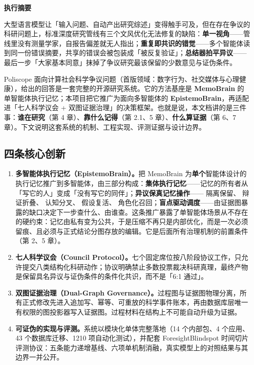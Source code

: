 \thispagestyle{fancy}
{\sffamily\bfseries\fontsize{20}{24}\selectfont\color{ink} 执行摘要\par}
\vspace{0.5em}
\noindent{\color{linegray}\rule{\linewidth}{1pt}}
\vspace{1em}

大型语言模型让「输入问题、自动产出研究综述」变得触手可及，但在存在争议的科研问题上，标准深度研究管线有三个文风优化无法修复的缺陷：\textbf{单一视角}——管线里没有测量学家，自报告偏差就无人指出；\textbf{重复即共识的错觉}——多个智能体读到同一份错误摘要，共享的错误会被包装成「被反复验证」；\textbf{总结器拍平异议}——最后一步「大家基本同意」抹掉了争议研究最该保留的少数意见与证伪条件。

\medskip
Poliscope 面向计算社会科学争议问题（首版领域：数字行为、社交媒体与心理健康），给出的回答是一套完整的开源研究系统。它的方法基座是 \textbf{MemoBrain} 的单智能体执行记忆；本项目把它推广为面向多智能体的 \textbf{EpistemoBrain}，再适配进「七人科学议会 + 双图证据治理」的决策框架。也就是说，本文档讲的是三件事：\textbf{谁在研究}（第 4 章）、\textbf{靠什么记得}（第 2.1、5 章）、\textbf{什么算证据}（第 6、7 章）。下文说明这套系统的机制、工程实现、评测证据与设计边界。

\subsection*{\sffamily\color{accentdk}四条核心创新}

\begin{enumerate}[leftmargin=1.6em, itemsep=4pt, topsep=4pt]
\item \textbf{多智能体执行记忆（EpistemoBrain）。}把 MemoBrain 为\textbf{单个}智能体设计的执行记忆推广到多智能体，由三部分构成：\textbf{集体执行记忆}——记忆的所有者从「写它的人」变成「没有写它的同伴」；\textbf{异议保真记忆操作}—— 隔离保留、 辩证折叠、 认知分叉、 假设复活、 角色化召回；\textbf{盲点驱动调度}——由证据图暴露的缺口决定下一步查什么、由谁查。这条推广暴露了单智能体场景从不存在的硬约束：记忆由私有变为公共，于是压缩不再只是内部优化，而是一次必须留痕、且必须与正式结论分图存放的编辑。它是后面所有治理机制的前置条件（第 2、5 章）。
\item \textbf{七人科学议会（Council Protocol）。}七个固定席位按八阶段协议工作，只允许提交八类结构化科研动作；协议明确禁止多数投票裁决科研真理，最终产物是保留具名异议与证伪条件的条件化共识，而不是「6:1 通过」。
\item \textbf{双图证据治理（Dual-Graph Governance）。}过程图与证据图物理分离，所有正式修改先进入追加写、幂等、可重放的科学事件账本，再由数据库层唯一有权限的图投影器写入证据图。过程材料在结构上不可能自动升级为证据。
\item \textbf{可证伪的实现与评测。}系统以模块化单体完整落地（14 个内部包、4 个应用、43 个数据库迁移、1210 项自动化测试），并配套 ForesightBlindspot 时间切片评测协议：五条能力递增基线、六项单机制消融，真实模型上的对照结果与其边界一并公开。
\end{enumerate}

